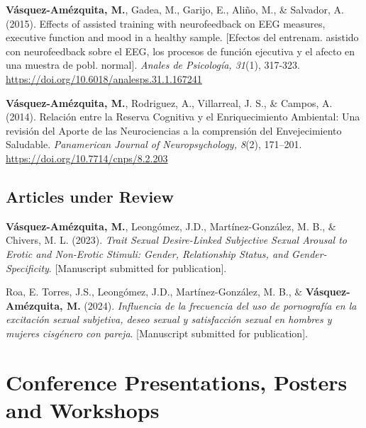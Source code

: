 \documentclass[11pt,a4paper,]{awesome-cv}
\begin{document}
\textbf{Vásquez-Amézquita, M.}, Gadea, M., Garijo, E., Aliño, M., \&
Salvador, A. (2015). Effects of assisted training with neurofeedback on
EEG measures, executive function and mood in a healthy sample.
{[}Efectos del entrenam. asistido con neurofeedback sobre el EEG, los
procesos de función ejecutiva y el afecto en una muestra de pobl.
normal{]}. \emph{Anales de Psicología, 31}(1), 317-323.
\url{https://doi.org/10.6018/analesps.31.1.167241}

\textbf{Vásquez-Amézquita, M.}, Rodriguez, A., Villarreal, J. S., \&
Campos, A. (2014). Relación entre la Reserva Cognitiva y el
Enriquecimiento Ambiental: Una revisión del Aporte de las Neurociencias
a la comprensión del Envejecimiento Saludable. \emph{Panamerican Journal
of Neuropsychology, 8}(2), 171--201.
\url{https://doi.org/10.7714/cnps/8.2.203}

\endgroup

\hypertarget{section-1}{%
\subsection{\texorpdfstring{\textbf{Articles under Review}}{}}\label{section-1}}

\begingroup
\footnotesize
\setlength{\parindent}{-0.5in}
\setlength{\leftskip}{0.5in}

\textbf{Vásquez-Amézquita, M.}, Leongómez, J.D., Martínez-González, M.
B., \& Chivers, M. L. (2023). \emph{Trait Sexual Desire-Linked
Subjective Sexual Arousal to Erotic and Non-Erotic Stimuli: Gender,
Relationship Status, and Gender-Specificity}. {[}Manuscript submitted
for publication{]}.

Roa, E. Torres, J.S., Leongómez, J.D., Martínez-González, M. B., \&
\textbf{Vásquez-Amézquita, M.} (2024). \emph{Influencia de la frecuencia
del uso de pornografía en la excitación sexual subjetiva, deseo sexual y
satisfacción sexual en hombres y mujeres cisgénero con pareja}.
{[}Manuscript submitted for publication{]}.

\endgroup

\hypertarget{conference-presentations-posters-and-workshops}{%
\section{Conference Presentations, Posters and
Workshops}\label{conference-presentations-posters-and-workshops}}

\begingroup
\footnotesize
\setlength{\parindent}{-0.5in}
\setlength{\leftskip}{0.5in}
\end{document}
